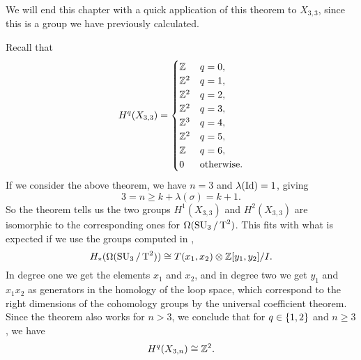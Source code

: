 We will end this chapter with a quick application of this theorem to
$X_{3,3}$, since this is a group we have previously calculated.

\begin{example}
  Recall that
  \[ H^q(X_{3,3}) = \begin{cases}
    \mathbb{Z} & q = 0, \\
    \mathbb{Z}^{2} & q=1, \\
    \mathbb{Z}^{2} & q=2, \\
    \mathbb{Z}^{2} & q=3, \\
    \mathbb{Z}^{3} & q=4, \\
    \mathbb{Z}^{2} & q=5, \\
    \mathbb{Z} & q=6, \\
    0 & \text{otherwise}.
  \end{cases} \]
  If we consider the above theorem, we have $n = 3$ and
  $\lambda(\operatorname{Id}) = 1$, giving
  \[ 3 = n \geq k +\lambda(\sigma) = k + 1. \]
  So the theorem tells us the two groups $H^1(X_{3,3})$ and
  $H^2(X_{3,3})$ are isomorphic to the corresponding
  ones for
  $\Omega(\operatorname{SU}_3/\operatorname{T}^2)$.
  This fits with what is expected if we use the groups computed in
  \cite{grbic},
  \[ H_*(\Omega(\operatorname{SU}_3/\operatorname{T}^2)) \cong T(x_1,x_{2}) \otimes
  \mathbb{Z}[y_1,y_{2}]/I. \]
  In degree one we get the elements $x_1$ and $x_2$, and in degree two
  we get $y_1$ and $x_1 x_2$ as generators in the homology of the loop
  space, which
  correspond to the right dimensions of the cohomology groups by the
  universal coefficient theorem. Since the theorem also works for $n >
  3$, we conclude that for $q\in \left\{ 1,2 \right\}$ and $n\geq 3$, we have
  \[ H^q(X_{3,n}) \cong \mathbb{Z}^2. \]
\end{example}

